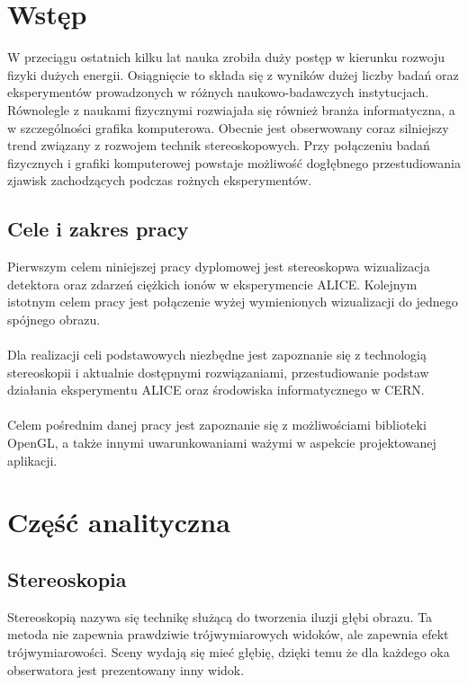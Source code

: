 
\graphicspath{{images/}}




\tableofcontents
\thispagestyle{empty}
\thesisstyle
\newpage 

\section[Wstęp]{Wstęp}
W przeciągu ostatnich kilku lat nauka zrobiła duży postęp w kierunku rozwoju fizyki dużych energii. Osiągnięcie to składa się z wyników dużej liczby badań oraz eksperymentów prowadzonych w różnych naukowo-badawczych instytucjach. Równolegle z naukami fizycznymi rozwiajała się również branża informatyczna, a w szczególności grafika komputerowa. Obecnie jest obserwowany coraz silniejszy trend związany z rozwojem technik stereoskopowych. Przy połączeniu badań fizycznych i grafiki komputerowej powstaje możliwość dogłębnego przestudiowania zjawisk zachodzących podczas rożnych eksperymentów.


\subsection{Cele i zakres pracy}
Pierwszym celem niniejszej pracy dyplomowej jest stereoskopwa wizualizacja detektora oraz zdarzeń ciężkich ionów w eksperymencie ALICE. Kolejnym istotnym celem pracy jest połączenie wyżej wymienionych wizualizacji do jednego spójnego obrazu. 
\paragraph{}
Dla realizacji celi podstawowych niezbędne jest zapoznanie się z technologią stereoskopii i aktualnie dostępnymi rozwiązaniami, przestudiowanie podstaw działania eksperymentu ALICE oraz środowiska informatycznego w CERN. \paragraph{}
Celem pośrednim danej pracy jest zapoznanie się z możliwościami biblioteki OpenGL, a także innymi uwarunkowaniami ważymi w aspekcie projektowanej aplikacji.

\newpage
\section[Część analityczna]{Część analityczna}

\subsection{Stereoskopia}
Stereoskopią nazywa się technikę służącą do tworzenia iluzji głębi obrazu. Ta metoda nie zapewnia prawdziwie trójwymiarowych widoków, ale zapewnia efekt trójwymiarowości. Sceny wydają się mieć głębię, dzięki temu że dla każdego oka obserwatora jest prezentowany inny widok. 

